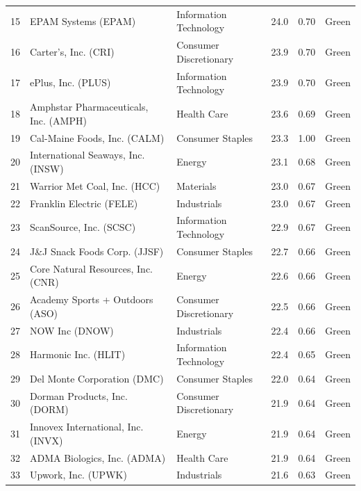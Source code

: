 \documentclass[11pt,a4paper]{article}
\begin{document}
{\begin{longtable}{r p{4.6cm} p{3cm} r r l}
15 & EPAM Systems (EPAM) & Information Technology & 24.0 & 0.70 & \cellcolor[HTML]{C6EFCE}Green \\
16 & Carter's, Inc. (CRI) & Consumer Discretionary & 23.9 & 0.70 & \cellcolor[HTML]{C6EFCE}Green \\
17 & ePlus, Inc. (PLUS) & Information Technology & 23.9 & 0.70 & \cellcolor[HTML]{C6EFCE}Green \\
18 & Amphstar Pharmaceuticals, Inc. (AMPH) & Health Care & 23.6 & 0.69 & \cellcolor[HTML]{C6EFCE}Green \\
19 & Cal-Maine Foods, Inc. (CALM) & Consumer Staples & 23.3 & 1.00 & \cellcolor[HTML]{C6EFCE}Green \\
20 & International Seaways, Inc. (INSW) & Energy & 23.1 & 0.68 & \cellcolor[HTML]{C6EFCE}Green \\
21 & Warrior Met Coal, Inc. (HCC) & Materials & 23.0 & 0.67 & \cellcolor[HTML]{C6EFCE}Green \\
22 & Franklin Electric (FELE) & Industrials & 23.0 & 0.67 & \cellcolor[HTML]{C6EFCE}Green \\
23 & ScanSource, Inc. (SCSC) & Information Technology & 22.9 & 0.67 & \cellcolor[HTML]{C6EFCE}Green \\
24 & J\&J Snack Foods Corp. (JJSF) & Consumer Staples & 22.7 & 0.66 & \cellcolor[HTML]{C6EFCE}Green \\
25 & Core Natural Resources, Inc. (CNR) & Energy & 22.6 & 0.66 & \cellcolor[HTML]{C6EFCE}Green \\
26 & Academy Sports + Outdoors (ASO) & Consumer Discretionary & 22.5 & 0.66 & \cellcolor[HTML]{C6EFCE}Green \\
27 & NOW Inc (DNOW) & Industrials & 22.4 & 0.66 & \cellcolor[HTML]{C6EFCE}Green \\
28 & Harmonic Inc. (HLIT) & Information Technology & 22.4 & 0.65 & \cellcolor[HTML]{C6EFCE}Green \\
29 & Del Monte Corporation (DMC) & Consumer Staples & 22.0 & 0.64 & \cellcolor[HTML]{C6EFCE}Green \\
30 & Dorman Products, Inc. (DORM) & Consumer Discretionary & 21.9 & 0.64 & \cellcolor[HTML]{C6EFCE}Green \\
31 & Innovex International, Inc. (INVX) & Energy & 21.9 & 0.64 & \cellcolor[HTML]{C6EFCE}Green \\
32 & ADMA Biologics, Inc. (ADMA) & Health Care & 21.9 & 0.64 & \cellcolor[HTML]{C6EFCE}Green \\
33 & Upwork, Inc. (UPWK) & Industrials & 21.6 & 0.63 & \cellcolor[HTML]{C6EFCE}Green \\

\end{longtable}}
\end{document}
